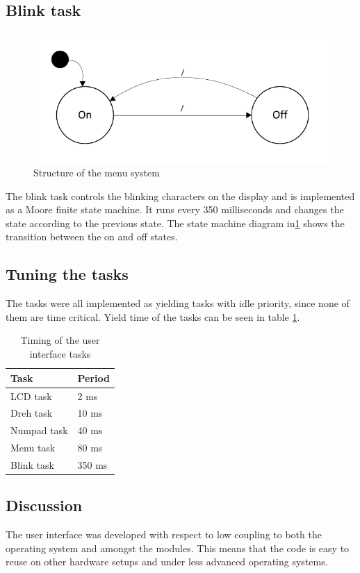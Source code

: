 \subsection{Blink task}
\begin{figure}[htb]
	\centering
	\includegraphics[scale=1,trim=0 0 0 0]{graphics/blink_task_fsm.pdf} 
	\caption{Structure of the menu system}
	\label{fig:blink_task_fsm}
\end{figure}
The blink task controls the blinking characters on the display and is implemented as a Moore finite state machine. It runs every 350 milliseconds and changes the state according to the previous state. The state machine diagram in\ref{fig:blink_task_fsm} shows the transition between the on and off states.

\subsection{Tuning the tasks}
The tasks were all implemented as yielding tasks with idle priority, since none of them are time critical. Yield time of the tasks can be seen in table \ref{tab:ui_task_timing}.

\begin{table}[htb]	
	\centering
	\begin{tabular}{l|l}					
	Task & Period \\					
	\hline							
LCD task & 2 ms \\
Dreh task  & 10 ms \\
Numpad task & 40 ms \\
Menu task & 80 ms \\
Blink task & 350 ms \\
	\end{tabular}
	\caption{Timing of the user interface tasks}	
	\label{tab:ui_task_timing}				
\end{table}

\subsection{Discussion}
The user interface was developed with respect to low coupling to both the operating system and amongst the modules. This means that the code is easy to reuse on other hardware setups and under less advanced operating systems. 

